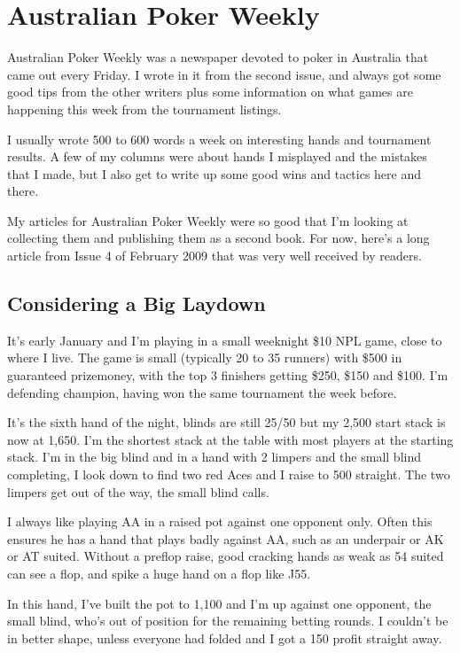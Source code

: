 \chapter{Australian Poker Weekly}


Australian Poker Weekly was a newspaper devoted to poker in Australia
that came out every Friday. I wrote in it from the second issue,
and always got some good tips from the other writers plus some information
on what games are happening this week from the tournament listings.

I usually wrote 500 to 600 words a week on interesting hands and
tournament results. A few of my columns were about hands I misplayed
and the mistakes that I made, but I also get to write up some good
wins and tactics here and there.

My articles for Australian Poker Weekly were so good that I'm
looking at collecting them and publishing them as a second book.
For now, here's a long article from Issue 4 of February 2009
that was very well received by readers.

\section{Considering a Big Laydown}

It's early January and I'm playing in a small weeknight \$10 NPL game,
close to where I live. The game is small (typically 20 to 35 runners) with
\$500 in guaranteed prizemoney, with the top 3 finishers getting \$250, \$150
and \$100. I'm defending champion, having won the same tournament
the week before.

It's the sixth hand of the night, blinds are still 25/50 but
my 2,500 start stack is now at 1,650. I'm the shortest stack at the
table with most players at the starting stack. I'm in the big blind and
in a hand with 2 limpers and the small blind completing, I look down to
find two red Aces and I raise to 500 straight. The two limpers get out
of the way, the small blind calls.

I always like playing AA in a raised pot against one opponent only.
Often this ensures he has a hand that plays badly against AA, such as
an underpair or AK or AT suited. Without a preflop raise, good
cracking hands as weak as 54 suited can see a flop, and spike a huge
hand on a flop like J55.

In this hand, I've built the pot to 1,100 and I'm up against one
opponent, the small blind, who's out of position for the remaining
betting rounds. I couldn't be in better shape, unless everyone had
folded and I got a 150 profit straight away.

